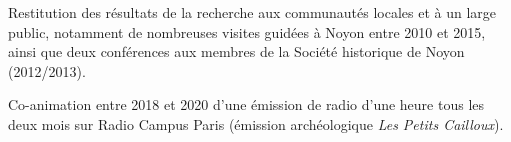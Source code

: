 
\begin{small} \color{black}
Restitution des résultats de la recherche aux communautés locales et à un large public, notamment de nombreuses visites guidées à Noyon entre 2010 et 2015, ainsi que deux conférences aux membres de la Société historique de Noyon (2012/2013).

Co-animation entre 2018 et 2020 d’une émission de radio d’une heure tous les deux mois sur Radio Campus Paris (émission archéologique \textit{Les Petits Cailloux}).
\end{small}

